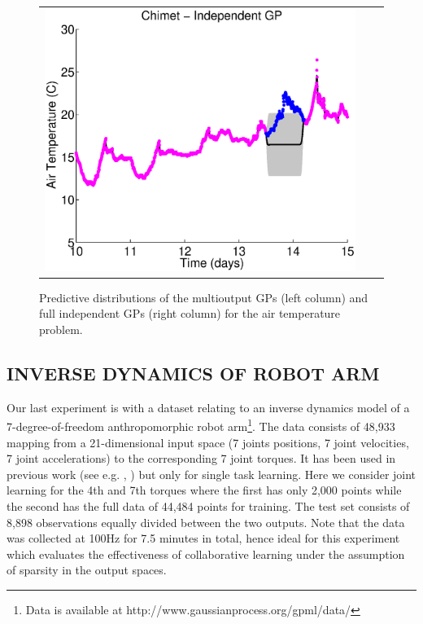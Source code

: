 \begin{figure}
\begin{tabular}{ccc}
\includegraphics[scale=0.3]{figures/weatherChimet.eps}
\end{tabular}
\caption{Predictive distributions of the multioutput GPs (left column) and full independent GPs (right column) for the air temperature problem.}
\label{fig:weather}
\end{figure}

\subsection{INVERSE DYNAMICS OF ROBOT ARM}
Our last experiment is with a dataset relating to an inverse dynamics model of a 7-degree-of-freedom anthropomorphic robot arm\footnote{Data is available at http://www.gaussianprocess.org/gpml/data/}.
The data consists of 48,933 mapping from a 21-dimensional input space (7 joints positions, 7 joint velocities, 7 joint accelerations) to the corresponding 7 joint torques.
It has been used in previous work (see e.g. \citet{rasmussen-williams-book},  \citet{vijayakumar2000locally}) but only for single task learning.
Here we consider joint learning for the 4th and 7th torques where the first has only 2,000 points  while the second has the full data of 44,484 points for training.
The test set consists of 8,898 observations equally divided between the two outputs.
Note that the data was collected at 100Hz for 7.5 minutes in total, hence ideal for this experiment which evaluates the effectiveness of collaborative learning under the assumption of sparsity in the output spaces.

